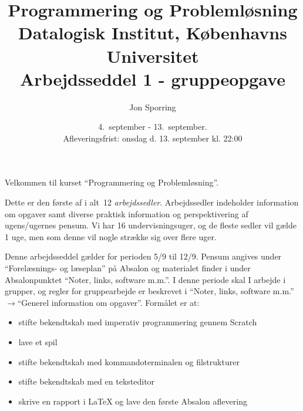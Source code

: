\documentclass[a4paper,12pt]{article}
\title{Programmering og Problemløsning\\Datalogisk Institut,
  Københavns Universitet\\Arbejdsseddel 1 - gruppeopgave}
\author{Jon Sporring}
\date{4.\ september - 13.\ september.\\Afleveringsfrist: onsdag d. 13. september kl. 22:00}
\begin{document}
\maketitle

Velkommen til kurset ``Programmering og Problemløsning''.

Dette er den første af i alt~12 \emph{arbejdssedler}. Arbejdssedler indeholder information om opgaver samt diverse praktisk information og perspektivering af ugens/ugernes pensum. Vi har 16 undervisningsuger, og de fleste sedler vil gælde 1 uge, men som denne vil nogle strække sig over flere uger.

Denne arbejdsseddel gælder for perioden 5/9 til 12/9. Pensum angives under "`Forelæsnings- og læseplan"' på Absalon og materialet finder i under Absalonpunktet "`Noter, links, software m.m."'.  I denne periode skal I arbejde i grupper, og regler for gruppearbejde er beskrevet i "`Noter, links, software m.m."'$\rightarrow$"`Generel information om opgaver"'. Formålet er at:
\begin{itemize}
\item stifte bekendtskab med imperativ programmering gennem Scratch
\item lave et spil
\item stifte bekendtskab med kommandoterminalen og filstrukturer
\item stifte bekendtskab med en teksteditor
\item skrive en rapport i LaTeX og lave den første Absalon aflevering
\end{itemize}
\end{document}
